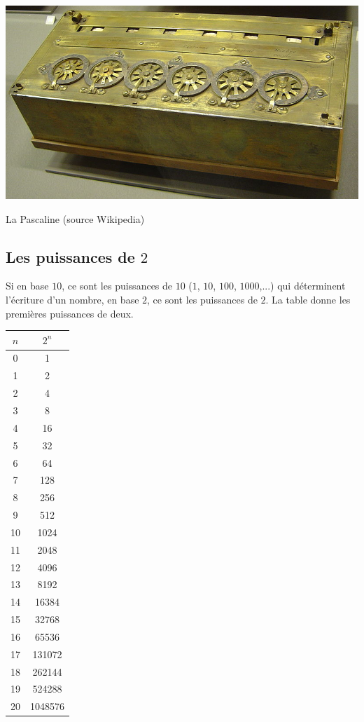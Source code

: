 \documentclass[class=report,crop=false]{standalone}
\begin{document}
\begin{center}
\includegraphics[scale=0.4]{Pascaline.jpg}

{La Pascaline (source Wikipedia)}
\end{center}

\subsection{Les puissances de $2$}

Si en base $10$, ce sont les puissances de $10$ ($1$, $10$, $100$, $1000$,...)
qui déterminent l'écriture
d'un nombre, en base $2$, ce sont les puissances de $2$. La table 
donne les premières puissances de deux.

\begin{center}
\begin{tabular}{cc}
$n$&$2^n$\\\hline
0&1\\
1&2\\
2&4\\
3&8\\
4&16\\
5&32\\
6&64\\
7&128\\
8&256\\
9&512\\
10&1024\\
11&2048\\
12&4096\\
13&8192\\
14&16384\\
15&32768\\
16&65536\\
17&131072\\
18&262144\\
19&524288\\
20&1048576
\end{tabular}
\end{center}
\end{document}
